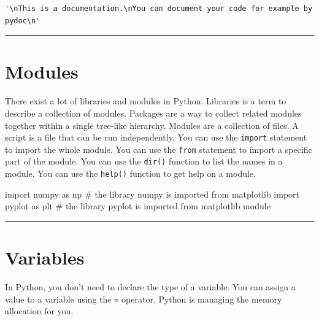 \documentclass[
  letterpaper,
  DIV=11,
  numbers=noendperiod]{scrreprt}
\newenvironment{Shaded}{\begin{snugshade}}{\end{snugshade}}
\newcommand{\CommentTok}[1]{\textcolor[rgb]{0.37,0.37,0.37}{#1}}
\newcommand{\ImportTok}[1]{\textcolor[rgb]{0.00,0.46,0.62}{#1}}
\newcommand{\NormalTok}[1]{\textcolor[rgb]{0.00,0.23,0.31}{#1}}
\begin{document}
\begin{verbatim}
'\nThis is a documentation.\nYou can document your code for example by pydoc\n'
\end{verbatim}

\begin{center}\rule{0.5\linewidth}{0.5pt}\end{center}

\chapter*{Modules}\label{modules}


There exist a lot of libraries and modules in Python. Libraries is a
term to describe a collection of modules. Packages are a way to collect
related modules together within a single tree-like hierarchy. Modules
are a collection of files. A script is a file that can be run
independently. You can use the \texttt{import} statement to import the
whole module. You can use the \texttt{from} statement to import a
specific part of the module. You can use the \texttt{dir()} function to
list the names in a module. You can use the \texttt{help()} function to
get help on a module.

\begin{Shaded}
\begin{Highlighting}[]
\ImportTok{import}\NormalTok{ numpy }\ImportTok{as}\NormalTok{ np }
\CommentTok{\# the library numpy is imported}
\ImportTok{from}\NormalTok{ matplotlib }\ImportTok{import}\NormalTok{ pyplot }\ImportTok{as}\NormalTok{ plt }
\CommentTok{\# the library pyplot is imported from matplotlib module}
\end{Highlighting}
\end{Shaded}

\begin{center}\rule{0.5\linewidth}{0.5pt}\end{center}

\chapter*{Variables}\label{variables}


In Python, you don't need to declare the type of a variable. You can
assign a value to a variable using the \texttt{=} operator. Python is
managing the memory allocation for you.
\end{document}
